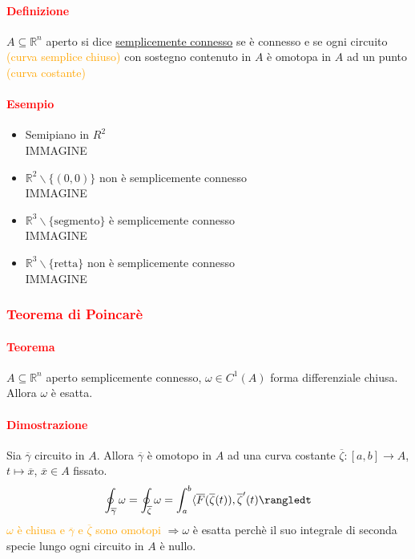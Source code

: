 \documentclass{article}
\newcommand{\R}{\mathbb{R}}
\begin{document}
\paragraph{\textcolor{red}{Definizione}}
$A \subseteq \R^n$ aperto si dice \underline{semplicemente connesso} se è connesso e se ogni circuito  \textcolor{orange}{(curva semplice chiuso)} con sostegno contenuto in $A$ è omotopa in $A$ ad un punto \textcolor{orange}{(curva costante)}

\paragraph{\textcolor{red}{Esempio}}
\begin{itemize}
    \item Semipiano in $R^2$\\
    IMMAGINE
    \item $\R^2 \backslash \{(0,0)\}$ non è semplicemente connesso\\
    IMMAGINE
    \item $\R^3 \backslash \{\text{segmento}\}$ è semplicemente connesso\\
    IMMAGINE
    \item $\R^3 \backslash \{\text{retta}\}$ non è semplicemente connesso\\
    IMMAGINE
\end{itemize}
\subsubsection{\textcolor{red}{Teorema di Poincarè}}
\paragraph{\textcolor{red}{Teorema}}
$A \subseteq \R^n$ aperto semplicemente connesso, $\omega \in C^1(A)$ forma differenziale chiusa. Allora $\omega$ è esatta. 

\paragraph{\textcolor{red}{Dimostrazione}}
Sia $\overline{\gamma}$ circuito in $A$. Allora $\overline{\gamma}$ è omotopo in $A$ ad una curva costante $\overline{\zeta}:[a,b]\rightarrow A$, $t \mapsto \overline{x}$, $\overline{x}\in A$ fissato.
\begin{equation*}
    \oint_{\overline{\gamma}} \omega = \oint_{\overline{\zeta}} \omega= \int_a^b \langle \overline{F}(\overline{\zeta}(t)), \overline{\zeta}'(t)\rangledt
\end{equation*}
\textcolor{orange}{$\omega$ è chiusa e $\overline{\gamma}$ e $\overline{\zeta}$ sono omotopi}
$\Rightarrow \omega$ è esatta perchè il suo integrale di seconda specie lungo ogni circuito in $A$ è nullo.
\begin{flushright}
    \Lightning
\end{flushright}
\end{document}
